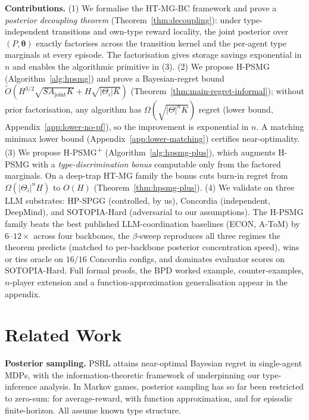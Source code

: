 \textbf{Contributions.} (1) We formalise the HT-MG-BC framework and prove a \emph{posterior decoupling theorem} (Theorem~\ref{thm:decoupling}): under type-independent transitions and own-type reward locality, the joint posterior over $(P, \boldsymbol{\theta})$ exactly factorises across the transition kernel and the per-agent type marginals at every episode. The factorisation gives storage savings exponential in $n$ and enables the algorithmic primitive in (3). (2) We propose H-PSMG (Algorithm~\ref{alg:hpsmg}) and prove a Bayesian-regret bound $\tilde O(H^{3/2}\sqrt{S A_{\mathrm{joint}} K} + H \sqrt{|\Theta_i| K})$ (Theorem~\ref{thm:main-regret-informal}); without prior factorisation, any algorithm has $\Omega(\sqrt{|\Theta|^n K})$ regret (lower bound, Appendix~\ref{app:lower-no-pf}), so the improvement is exponential in $n$. A matching minimax lower bound (Appendix~\ref{app:lower-matching}) certifies near-optimality. (3) We propose H-PSMG\textsuperscript{+} (Algorithm~\ref{alg:hpsmg-plus}), which augments H-PSMG with a \emph{type-discrimination bonus} computable only from the factored marginals. On a deep-trap HT-MG family the bonus cuts burn-in regret from $\Omega(|\Theta_i|^n H)$ to $O(H)$ (Theorem~\ref{thm:hpsmg-plus}). (4) We validate on three LLM substrates: HP-SPGG (controlled, by us), Concordia (independent, DeepMind), and SOTOPIA-Hard (adversarial to our assumptions). The H-PSMG family beats the best published LLM-coordination baselines (ECON, A-ToM) by $6$--$12\times$ across four backbones, the $\beta$-sweep reproduces all three regimes the theorem predicts (matched to per-backbone posterior concentration speed), wins or ties oracle on $16/16$ Concordia configs, and dominates evaluator scores on SOTOPIA-Hard. Full formal proofs, the BPD worked example, counter-examples, $n$-player extension and a function-approximation generalisation appear in the appendix.

\section{Related Work}
\label{sec:related}

\textbf{Posterior sampling.} PSRL \citep{strens2000bayesian,osband2013more,agrawal2017optimistic,ouyang2017learning} attains near-optimal Bayesian regret in single-agent MDPs, with the information-theoretic framework of \citet{russo2014learning,russo2016information} underpinning our type-inference analysis. In Markov games, posterior sampling has so far been restricted to zero-sum: \citet{jafarnia2021learning} for average-reward, \citet{xiong2022self} with function approximation, and \citet{yueh2026bayesian} for episodic finite-horizon. All assume known type structure.

